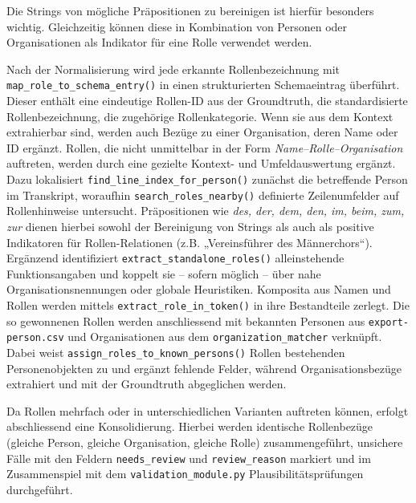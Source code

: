 \documentclass[12pt, a4paper, ngerman, bidi=default]{article}
\newcommand{\code}[1]{\colorbox{VeryLightGray}{\texttt{#1}}} %
\begin{document}
Die Strings von mögliche Präpositionen zu bereinigen ist hierfür besonders wichtig. Gleichzeitig können diese in Kombination von Personen oder Organisationen als Indikator für eine Rolle verwendet werden.

Nach der Normalisierung wird jede erkannte Rollenbezeichnung mit \code{map\_role\_to\_schema\_entry()} in einen strukturierten Schemaeintrag überführt. Dieser enthält eine eindeutige Rollen-ID aus der Groundtruth, die standardisierte Rollenbezeichnung, die zugehörige Rollenkategorie. Wenn sie aus dem Kontext extrahierbar sind, werden auch Bezüge zu einer Organisation, deren Name oder ID ergänzt. Rollen, die nicht unmittelbar in der Form \emph{Name–Rolle–Organisation} auftreten, werden durch eine gezielte Kontext- und Umfeldauswertung ergänzt. Dazu lokalisiert \code{find\_line\_index\_for\_person()} zunächst die betreffende Person im Transkript, woraufhin \code{search\_roles\_nearby()} definierte Zeilenumfelder auf Rollenhinweise untersucht. Präpositionen wie \textit{des, der, dem, den, im, beim, zum, zur} dienen hierbei sowohl der Bereinigung von Strings als auch als positive Indikatoren für Rollen-Relationen (z.B. „Vereinsführer des Männerchors“). Ergänzend identifiziert \code{extract\_standalone\_roles()} alleinstehende Funktionsangaben und koppelt sie – sofern möglich – über nahe Organisationsnennungen oder globale Heuristiken. Komposita aus Namen und Rollen werden mittels \code{extract\_role\_in\_token()} in ihre Bestandteile zerlegt.
Die so gewonnenen Rollen werden anschliessend mit bekannten Personen aus \code{export-person.csv} und Organisationen aus dem \code{organization\_matcher} verknüpft. Dabei weist \code{assign\_roles\_to\_known\_persons()} Rollen bestehenden Personenobjekten zu und ergänzt fehlende Felder, während Organisationsbezüge extrahiert und mit der Groundtruth abgeglichen werden.

Da Rollen mehrfach oder in unterschiedlichen Varianten auftreten können, erfolgt abschliessend eine Konsolidierung. Hierbei werden identische Rollenbezüge (gleiche Person, gleiche Organisation, gleiche Rolle) zusammengeführt, unsichere Fälle mit den Feldern \code{needs\_review} und \code{review\_reason} markiert und im Zusammenspiel mit dem \code{validation\_module.py} Plausibilitätsprüfungen durchgeführt.
\end{document}
